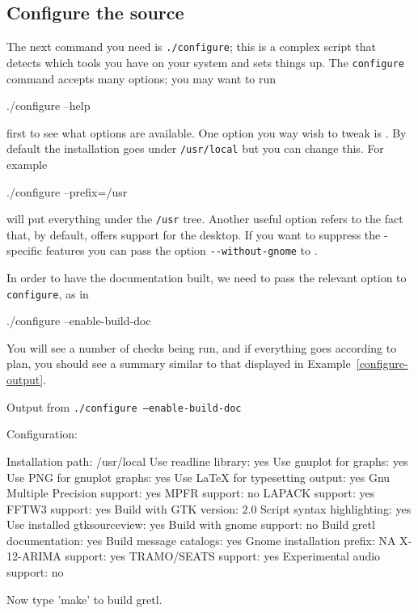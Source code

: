 \subsection{Configure the source}
          
The next command you need is \texttt{./configure}; this is a complex
script that detects which tools you have on your system and sets
things up. The \texttt{configure} command accepts many
options; you may want to run 
\begin{code}
./configure --help
\end{code}
first to see what options are available. One option you way wish to
tweak is .  By default the installation goes under
\verb+/usr/local+ but you can change this.  For example
\begin{code}
./configure --prefix=/usr
\end{code}
will put everything under the \verb+/usr+ tree.  Another useful option
refers to the fact that, by default,  offers support for
the  desktop.  If you want to suppress the
-specific features you can pass the option
\verb+--without-gnome+ to .

In order to have the documentation built, we need to pass the relevant
option to \texttt{configure}, as in
\begin{code}
./configure --enable-build-doc
\end{code}
You will see a number of checks being run, and if everything goes
according to plan, you should see a summary similar to that displayed
in Example~\ref{configure-output}.

\begin{script}[htbp]
  \caption{Output from \texttt{./configure --enable-build-doc}}
  \label{configure-output}
\begin{scode}
Configuration:

  Installation path:                      /usr/local
  Use readline library:                   yes
  Use gnuplot for graphs:                 yes
  Use PNG for gnuplot graphs:             yes
  Use LaTeX for typesetting output:       yes
  Gnu Multiple Precision support:         yes
  MPFR support:                           no
  LAPACK support:                         yes
  FFTW3 support:                          yes
  Build with GTK version:                 2.0
  Script syntax highlighting:             yes
  Use installed gtksourceview:            yes
  Build with gnome support:               no
  Build gretl documentation:              yes
  Build message catalogs:                 yes
  Gnome installation prefix:              NA
  X-12-ARIMA support:                     yes
  TRAMO/SEATS support:                    yes
  Experimental audio support:             no

Now type 'make' to build gretl.
\end{scode}
\end{script}

